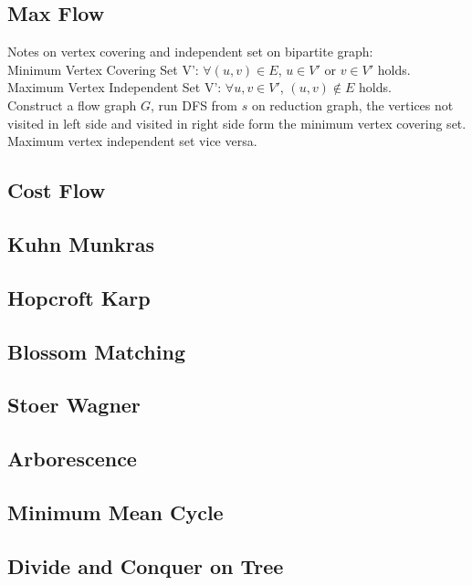 ﻿\documentclass[10pt]{article}
\begin{document}
{\subsection{Max Flow}

Notes on vertex covering and independent set on bipartite graph:\\
Minimum Vertex Covering Set V': $\forall (u,v) \in E$, $u \in V'$ or $v \in V'$ holds. \\
Maximum Vertex Independent Set V': $\forall u,v \in V'$, $(u,v) \notin E$ holds.\\
Construct a flow graph $G$, run DFS from $s$ on reduction graph, the vertices not visited in left side and visited in right side form the minimum vertex covering set.\\
Maximum vertex independent set vice versa.\\
\subsection{Cost Flow}

\subsection{Kuhn Munkras}

\subsection{Hopcroft Karp}

\subsection{Blossom Matching}

\subsection{Stoer Wagner}

\subsection{Arborescence}

\subsection{Minimum Mean Cycle}

\subsection{Divide and Conquer on Tree}

}
\end{document}
